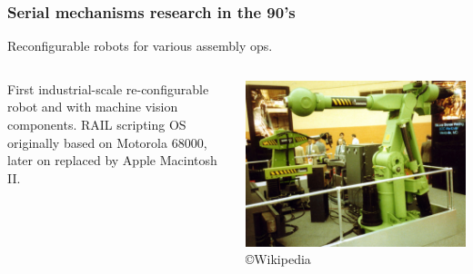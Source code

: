 \begin{frame}
\frametitle{Serial mechanisms research in the 90's}
%
\begin{tcolorbox}[title=Automatix,toggle enlargement=none]
Reconfigurable robots for various assembly ops.
\end{tcolorbox}
\begin{columns}[b]
\begin{column}{.48\columnwidth}			
\begin{tcolorbox}[colframe=blue!80!green, coltitle=white!80,toggle enlargement=none]
First industrial-scale re-configurable robot and with machine vision components. RAIL scripting OS originally based on Motorola 68000, later on replaced by Apple Macintosh II. 
\end{tcolorbox}
\end{column}
\begin{column}{.52\columnwidth}
\includegraphics[width=\textwidth]{figures/Automatix.jpg}
\copyright Wikipedia
\end{column}
\end{columns}
\end{frame}

